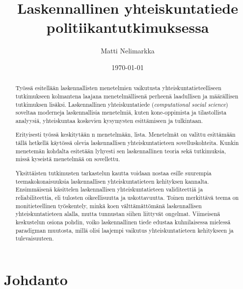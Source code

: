 \documentclass[finnish,gradu,twoside,12pt]{tktltiki}
\begin{document}

\title{Laskennallinen yhteiskuntatiede politiikantutkimuksessa}
\author{Matti Nelimarkka}
\date{\today}

\numberofpagesinformation{}

\keywords{}

\maketitle

\begin{abstract}
Työssä esitellään laskennallisten menetelmien vaikutusta yhteiskuntatieteelliseen tutkimukseen kolmantena laajana menetelmällisenä perheenä laadullisen ja määrällisen tutkimuksen lisäksi. Laskennallinen yhteiskuntatiede (\textit{computational social science}) soveltaa moderneja laskennallisia menetelmiä, kuten kone-oppimista ja tilastollista analyysiä, yhteiskuntaa koskevien kysymysten esittämiseen ja tulkintaan.

Erityisesti työssä keskitytään n menetelmään, lista. Menetelmät on valittu esittämään tällä hetkellä käytössä olevia laskennallisen yhteiskuntatieteen sovelluskohteita. Kunkin menetemän kohdalta esitetään lyhyesti sen laskennallinen teoria sekä tutkimuksia, missä kyseistä menetelmää on sovellettu.

Yksittäisten tutkimusten tarkastelun kautta voidaan nostaa esille suurempia teemakokonaisuuksia laskennallisen yhteiskuntatieteen kehityksen kannalta. Ensimmäisenä käsittelen laskennallisen yhteiskuntatieteen validiteettiä ja reliabiliteettia, eli tulosten oikeellisuutta ja uskottavuutta. Toinen merkittävä teema on monitieteellinen työskentely, minkä koen välttämättömänä laskennallisen yhteiskuntatieteen alalla, mutta tunnustan siihen liittyvät ongelmat. Viimeisenä keskustelun osiona pohdin, voiko laskennallinen tiede edustaa kuhnilaisessa mielessä paradigman muutosta, millä olisi laajempi vaikutus yhteiskuntatieteen kehitykseen ja tulevaisuuteen.
\end{abstract}

\mytableofcontents

\section{Johdanto}
\end{document}
